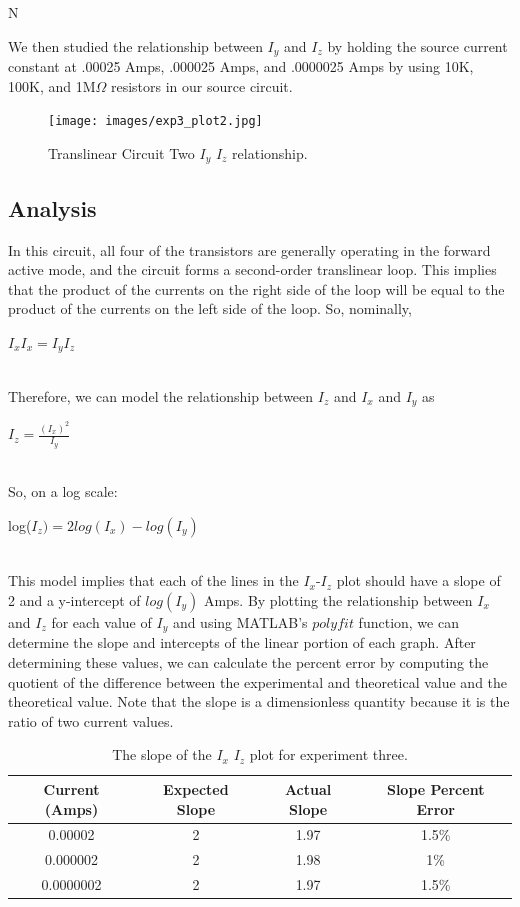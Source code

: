 N\documentclass{article}
\begin{document}
We then studied the relationship between $I_y$ and $I_z$ by holding the source current constant at .00025 Amps, .000025 Amps, and .0000025 Amps by using 10K, 100K, and 1M$\Omega$ resistors in our source circuit. 
\begin{figure}[H]   
  \centering        
  \texttt{[image: images/exp3\_plot2.jpg]}
  \caption{Translinear Circuit Two $I_y$ $I_z$ relationship.} 
  \label{fig:exp1_ixiz}
\end{figure}

\subsection{Analysis}
In this circuit, all four of the transistors are generally operating in the forward active mode, and the circuit forms a second-order translinear loop. This implies that the product of the currents on the right side of the loop will be equal to the product of the currents on the left side of the loop. So, nominally, 
\begin{center}
    $I_xI_x = I_yI_z$
\end{center}
\\
Therefore, we can model the relationship between $I_z$ and $I_x$ and $I_y$ as 
\begin{center}
    $I_z = \frac{(I_x)^2}{I_y}$
\end{center}
\\
So, on a log scale:
\begin{center}
    log($I_z) = 2log(I_x) - log({I_y})$
\end{center}
\\
This model implies that each of the lines in the $I_x$-$I_z$ plot should have a slope of 2 and a y-intercept of $log(I_y)$ Amps. By plotting the relationship between $I_x$ and $I_z$ for each value of $I_y$ and using MATLAB's $polyfit$ function, we can determine the slope and intercepts of the linear portion of each graph. After determining these values, we can calculate the percent error by computing the quotient of the difference between the experimental and theoretical value and the theoretical value. Note that the slope is a dimensionless quantity because it is the ratio of two current values.
\\
\newline
\begin{table}[h]
    \centering
    \begin{tabular}{|c|c|c|c|}
        \hline
        Current (Amps) & Expected Slope & Actual Slope & Slope Percent Error \\ \hline
        0.00002 & 2 & 1.97 & 1.5\%  \\ \hline
        0.000002 & 2 & 1.98 & 1\% \\  \hline 
        0.0000002 & 2 & 1.97 & 1.5\% \\ \hline
    \end{tabular}
    \caption{The slope of the $I_x$  $I_z$ plot for experiment three.}
    \label{tab:my_label}
\end{table}
\end{document}
